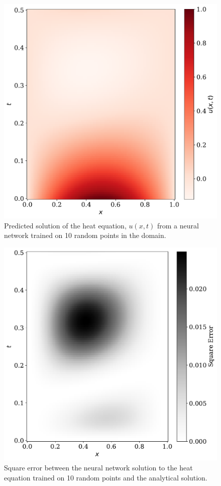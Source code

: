 \documentclass[a4paper, 
amsfonts, 
amssymb, 
amsmath, 
reprint, 
showkeys, 
nofootinbib, 
twoside]{revtex4-2}
\begin{document}
\begin{figure}
    \centering
    \includegraphics[width=.9\columnwidth]{Figures/nn_pred10.pdf}
    \caption{Predicted solution of the heat equation, $u(x, t)$ from a neural network trained on 10 random points in the domain.}
    \label{fig:nn_pred_10}
\end{figure}


\begin{figure}
    \centering
    \includegraphics[width=.9\columnwidth]{Figures/nn_sqr_err10.pdf}
    \caption{ Square error between the neural network solution to the heat equation trained on 10 random points and the analytical solution.}
    \label{fig:nn_sqr_err_10}
\end{figure}
\end{document}
